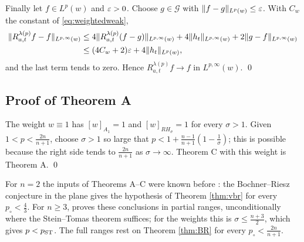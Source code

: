 Finally let $f\in L^p(w)$ and $\varepsilon>0$. Choose $g\in\mathcal G$ with $\|f-g\|_{L^p(w)}\le\varepsilon$. With $C_w$
the constant of \eqref{eq:weightedweak},
\begin{align*}
\|R^{\lambda(p)}_{a,t}f-f\|_{L^{p,\infty}(w)}
&\le4\|R^{\lambda(p)}_{a,t}(f-g)\|_{L^{p,\infty}(w)}+4\|h_t\|_{L^{p,\infty}(w)}+2\|g-f\|_{L^{p,\infty}(w)}\\
&\le(4C_w+2)\varepsilon+4\|h_t\|_{L^p(w)},
\end{align*}
and the last term tends to zero. Hence $R^{\lambda(p)}_{a,t}f\to f$ in $L^{p,\infty}(w)$. \qed

\subsection{Proof of Theorem A}\label{ssec:proofA}
The weight $w\equiv1$ has $[w]_{A_1}=1$ and $[w]_{RH_\sigma}=1$ for every $\sigma>1$. Given
$1<p<\frac{2n}{n+1}$, choose $\sigma>1$ so large that
$p<1+\frac{n-1}{n+1}(1-\frac1\sigma)$; this is possible because the right side tends to
$\frac{2n}{n+1}$ as $\sigma\to\infty$. Theorem C with this weight is Theorem A. \qed

\begin{remark}\label{rem:wherenew}
For $n=2$ the inputs of Theorems A--C were known before \cite{OAI26}: the Bochner--Riesz conjecture in
the plane \cite{CS72} gives the hypothesis of Theorem \ref{thm:vbr} for every $p_\circ<\frac43$. For
$n\ge3$, \cite{BRS25} proves these conclusions in partial ranges, unconditionally where the
Stein--Tomas theorem suffices; for the weights this is $\sigma\le\frac{n+3}2$, which gives $p<p_{\rm ST}$.
The full ranges rest on Theorem \ref{thm:BR} for every $p_\circ<\frac{2n}{n+1}$.
\end{remark}
